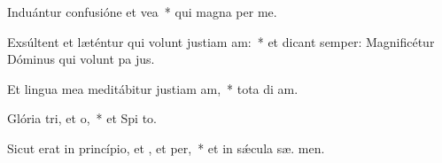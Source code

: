 \item Induántur confusióne et vea~* qui magna  per me.
\item Exsúltent et læténtur qui volunt justiam am:~* et dicant semper: Magnificétur Dóminus qui volunt pa  jus.
\item Et lingua mea meditábitur justiam am,~* tota di  am.
\item Glória tri, et o,~* et Spi to.
\item Sicut erat in princípio, et , et per,~* et in sǽcula sæ. men.
